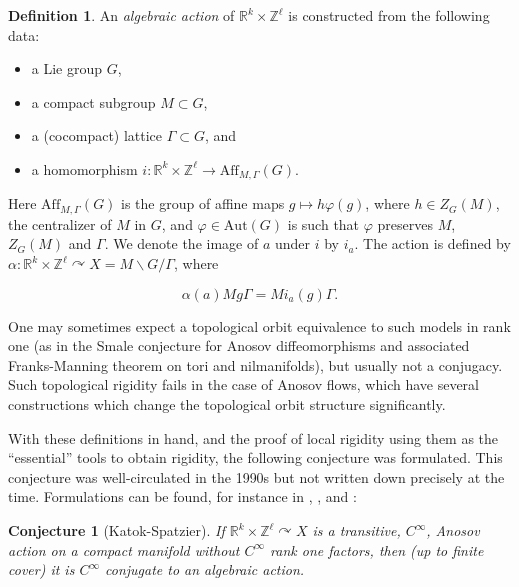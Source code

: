 \documentclass[12pt]{amsart}
\newtheorem{conjecture}[theorem]{Conjecture}
\theoremstyle{definition}
\newtheorem{definition}[theorem]{Definition}
\theoremstyle{remark}
\numberwithin{equation}{section}
\newcommand{\Aff}{\mathrm{Aff}}
\newcommand{\Aut}{\mathrm{Aut}}
\newcommand{\Z}{\mathbb{Z}}
\newcommand{\R}{\mathbb{R}}
\newtheorem{Structural Stability Theorem}[theorem]{Structural Stability Theorem}
\begin{document}
\begin{definition}
An {\it algebraic action} of $\R^k \times \Z^\ell$ is constructed from the following data:

\begin{itemize}
\item a Lie group $G$, 
\item a compact subgroup $M \subset G$, 
\item a (cocompact) lattice $\Gamma \subset G$, and 
\item a homomorphism $i : \R^k \times \Z^\ell \to \Aff_{M,\Gamma}(G)$.
\end{itemize}

Here $\Aff_{M,\Gamma}(G)$ is the group of affine maps $g \mapsto h\varphi(g)$, where $h \in Z_G(M)$, the centralizer of $M$ in  $G$, and $\varphi \in \Aut(G)$ is such that $\varphi$ preserves $M$, $Z_G(M)$ and $\Gamma$. We denote the image of $a$ under $i$ by $i_a$. The action is defined by $\alpha : \R^k \times \Z^\ell \curvearrowright X = M \backslash G / \Gamma$, where

\[ \alpha(a)  Mg\Gamma = Mi_a(g)\Gamma. \]
\end{definition}

One may sometimes expect a topological orbit equivalence to such models in rank one (as in the Smale conjecture for Anosov diffeomorphisms and associated Franks-Manning theorem on tori and nilmanifolds), but usually not a conjugacy. Such topological rigidity fails in the case of Anosov flows, which have several constructions which change the topological orbit structure significantly.

With these definitions in hand, and the proof of local rigidity using them as the ``essential'' tools to obtain rigidity, the following conjecture was formulated. { This conjecture was well-circulated in the 1990s but not written down precisely at the time. Formulations can be found, for instance in \cite[Conjecture 16.8]{hass07}, \cite[Section 5]{katok-collected}, and \cite[(2.4)]{burns-katok}:}

\begin{conjecture}[Katok-Spatzier]
\label{conj:kat-spa}
If $\R^k \times \Z^\ell \curvearrowright X$ is a transitive, $C^\infty$, Anosov action on a compact manifold without $C^\infty$ rank one factors, then (up to finite cover) it is $C^\infty$ conjugate to an algebraic action.
\end{conjecture}


\end{document}
